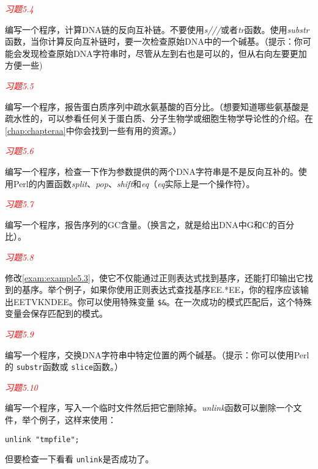 \textcolor{red}{\textit{习题5.4}}
\begin{adjustwidth}{4em}{}
编写一个程序，计算DNA链的反向互补链。不要使用\textit{s///}或者\textit{tr}函数。使用\textit{substr}函数，当你计算反向互补链时，要一次检查原始DNA中的一个碱基。（提示：你可能会发现检查原始DNA字符串时，尽管从左到右也是可以的，但从右向左要更加方便一些) 
\end{adjustwidth}

\textcolor{red}{\textit{习题5.5}}
\begin{adjustwidth}{4em}{}
编写一个程序，报告蛋白质序列中疏水氨基酸的百分比。（想要知道哪些氨基酸是疏水性的，可以参看任何关于蛋白质、分子生物学或细胞生物学导论性的介绍。在\autoref{chap:chapteraa}中你会找到一些有用的资源。）
\end{adjustwidth}

\textcolor{red}{\textit{习题5.6}}
\begin{adjustwidth}{4em}{}
编写一个程序，检查一下作为参数提供的两个DNA字符串是不是反向互补的。使用Perl的内置函数\textit{split}、\textit{pop}、\textit{shift}和\textit{eq}（\textit{eq}实际上是一个操作符）。
\end{adjustwidth}

\textcolor{red}{\textit{习题5.7}}
\begin{adjustwidth}{4em}{}
编写一个程序，报告序列的GC含量。（换言之，就是给出DNA中G和C的百分比）。
\end{adjustwidth}

\textcolor{red}{\textit{习题5.8}}
\begin{adjustwidth}{4em}{}
修改\autoref{exam:example5.3}，使它不仅能通过正则表达式找到基序，还能打印输出它找到的基序。举个例子，如果你使用正则表达式查找基序EE.*EE，你的程序应该输出EETVKNDEE。你可以使用特殊变量 \verb|$&|。在一次成功的模式匹配后，这个特殊变量会保存匹配到的模式。
\end{adjustwidth}

\textcolor{red}{\textit{习题5.9}}
\begin{adjustwidth}{4em}{}
编写一个程序，交换DNA字符串中特定位置的两个碱基。（提示：你可以使用Perl的 \verb|substr|函数或 \verb|slice|函数。）
\end{adjustwidth}

\textcolor{red}{\textit{习题5.10}}
\begin{adjustwidth}{4em}{}
编写一个程序，写入一个临时文件然后把它删除掉。\textit{unlink}函数可以删除一个文件，举个例子，这样来使用：
\begin{lstlisting}
unlink "tmpfile";
\end{lstlisting}
但要检查一下看看 \verb|unlink|是否成功了。
\end{adjustwidth}
